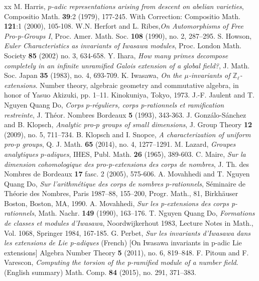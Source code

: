 \documentclass[12pt,a4paper,twoside,english]{smfart}
\def\Z{{\mathbb Z}}
\begin{document}
\begin{thebibliography}{xx}
         M. Harris, {\em $p$-adic representations arising from descent on abelian varieties}, Compositio Math. {\bf 39}:2 (1979), 177-245. With Correction: Compositio Math. {\bf 121}:1 (2000), 105-108.
  W.N. Herfort and L. Ribes,{\em On Automorphisms of Free Pro-p-Groups I},  Proc. Amer. Math. Soc. {\bf 108} (1990), no. 2, 287–295.
  S. Howson, {\em Euler Characteristics as invariants of Iwasawa modules}, Proc. London Math. Society {\bf 85} (2002) no. 3, 634-658.
  Y. Ihara,  {\em How many primes decompose completely in an infinite unramified Galois extension of a global field?}, 
 J. Math. Soc. Japan {\bf 35} (1983), no. 4, 693-709.
 K. Iwasawa, {\em On the $\mu$-invariants of $\Z_\ell$-extensions}. Number theory, algebraic geometry and commutative algebra, in honor of Yasuo Akizuki, pp. 1–11. Kinokuniya, Tokyo, 1973.
 J.-F. Jaulent and T. Nguyen Quang Do, {\em Corps $p$-r\'eguliers, corps p-rationnels et ramification restreinte}, J. Th\'eor. Nombres Bordeaux {\bf 5} (1993), 343-363.
 J. Gonz\'alo-S\'anchez  and B. Klopsch, {\em Analytic pro-$p$ groups  of small dimensions},  J. Group Theory {\bf 12} (2009), no. 5, 711–734.
 B. Klopsch  and I. Snopce, {\em A characterization of uniform pro-$p$ groups},  Q. J. Math. {\bf 65} (2014), no. 4, 1277–1291.
M. Lazard, {\em Groupes analytiques $p$-adiques}, IHES, Publ. Math. {\bf 26} (1965), 389-603.
C. Maire, {\em Sur la dimension cohomologique des pro-p-extensions des corps de nombres}, J. Th. des Nombres de Bordeaux {\bf 17} fasc. 2 (2005), 575-606.
 A. Movahhedi and T. Nguyen Quang Do, {\em Sur l'arithm\'etique des corps de nombres $p$-rationnels}, S\'eminaire de Th\'eorie des Nombres, Paris 1987–88, 155–200, Progr. Math., 81, Birkh\"auser Boston, Boston, MA, 1990.
  A. Movahhedi,  {\em Sur les p-extensions des corps p-rationnels},   Math. Nachr. {\bf 149} (1990), 163–176.
 T. Nguyen Quang Do, {\em Formations de classes et modules d'Iwasawa}, Noordwijkerhout 1983, Lecture Notes in Math., Vol. 1068, Springer 1984,  167-185.
 G. Perbet, {\em Sur les invariants d'Iwasawa dans les extensions de Lie p-adiques} (French) [On Iwasawa invariants in p-adic Lie extensions] Algebra Number Theory {\bf 5} (2011), no. 6, 819–848.
 F. Pitoun and F. Varescon, {\em Computing the torsion of the p-ramified module of a number field}. (English summary) Math. Comp. {\bf 84} (2015), no. 291, 371–383. 

\end{thebibliography}
\end{document}
